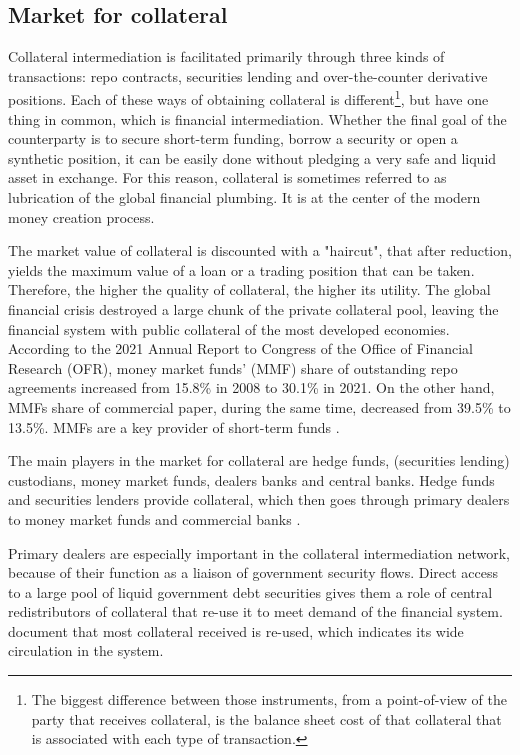 \documentclass[11pt,a4paper,english,oneside]{article}
\begin{document}
\subsection{Market for collateral}

Collateral intermediation is facilitated primarily through three kinds of transactions: repo contracts, securities lending and over-the-counter derivative positions. Each of these ways of obtaining collateral is different\footnote{The biggest difference between those instruments, from a point-of-view of the party that receives collateral, is the balance sheet cost of that collateral that is associated with each type of transaction.}, but have one thing in common, which is financial intermediation. Whether the final goal of the counterparty is to secure short-term funding, borrow a security or open a synthetic position, it can be easily done without pledging a very safe and liquid asset in exchange. For this reason, collateral is sometimes referred to as lubrication of the global financial plumbing. It is at the center of the modern money creation process.

The market value of collateral is discounted with a "haircut", that after reduction, yields the maximum value of a loan or a trading position that can be taken. Therefore, the higher the quality of collateral, the higher its utility. The global financial crisis destroyed a large chunk of the private collateral pool, leaving the financial system with public collateral of the most developed economies. According to the 2021 Annual Report to Congress of the Office of Financial Research (OFR), money market funds' (MMF) share of outstanding repo agreements increased from 15.8\% in 2008 to 30.1\% in 2021. On the other hand, MMFs share of commercial paper, during the same time, decreased from 39.5\% to 13.5\%. MMFs are a key provider of short-term funds \citet{ofr2021}.

The main players in the market for collateral are hedge funds, (securities lending) custodians, money market funds, dealers banks and central banks. Hedge funds and securities lenders provide collateral, which then goes through primary dealers to money market funds and commercial banks \citet{singh2017}.

Primary dealers are especially important in the collateral intermediation network, because of their function as a liaison of government security flows. Direct access to a large pool of liquid government debt securities gives them a role of central redistributors of collateral that re-use it to meet demand of the financial system. \citet{infante2020} document that most collateral received is re-used, which indicates its wide circulation in the system.
\end{document}
